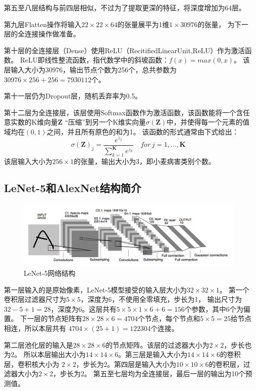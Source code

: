   第五至八层结构与前四层相似，不过为了提取更深的特征，将深度增加为64层。

  第九层Flatten操作将输入$22\times22\times64$的张量展平为1维$1\times30976$的张量，
  为下一层的全连接操作做准备。

  第十层的全连接层（Dense）使用ReLU（RecitifiedLinearUnit,ReLU）作为激活函数。
  ReLU即线性整流函数，指代数学中的斜坡函数：$f(x)=max(0,x)$。
  该层输入大小为$30976$，输出节点个数为256个，总共参数为$30976\times256+256=7930112$个。

  第十一层仍为Dropout层，随机丢弃率为0.5。

  第十二层为全连接层，该层使用Softmax函数作为激活函数，该函数能将一个含任意实数的K维向量$\mathbf{Z}$
  “压缩”到另一个K维实向量$\sigma(\mathbf{Z})$中，并使得每一个元素的值域均在$(0,1)$之间，并且所有原色的和为1。
  该函数的形式通常由下式给出：
  \[
    \sigma(\mathbf{Z})_j=\frac{e^{z_j}}{\sum^\mathbf{K}_{k=1} e^{z_k}} \quad for\ j=1, \dots,\mathbf{K}
  \]
  该层输入大小为$256\times1$的张量，输出大小为3，即小麦病害类别个数。




\subsection{\hei\xiaosan\textbf{LeNet-5和AlexNet结构简介}}
  \begin{figure}[htbp]
    \centering
    \includegraphics[width=\textwidth, natwidth=1612, natheight=482]{resource/2.4-网络结构.png}
    \caption{LeNet-5网络结构}
    \label{Figure.Third.2}
  \end{figure}
  第一层输入的是原始像素，LeNet-5模型接受的输入层大小为$32\times32\times1$。
  第一个卷积层过滤器尺寸为$5\times5$，深度为6，不使用全零填充，步长为1，
  输出尺寸为$32-5+1=28$，深度为6。这层共有$5\times5\times1\times6+6=156$个参数，其中6个为偏置。
  下一层的节点矩阵有$28\times28\times6=4704$个节点，每个节点和$5\times5=25$给节点相连，所以本层共有
  $4704\times(25+1)=122304$个连接。

  第二层池化层的输入是$28\times28\times6$的节点矩阵。该层的过滤器大小为$2\times2$，步长也为2。
  所以本层输出大小为$14\times14\times6$。第三层是输入大小为$14\times14\times6$的卷积层，卷积核大小为
  $2\times2$，步长为2。第四层是输入大小为$10\times10\times6$的卷积层，过滤器大小为$2\times2$，步长为2。
  第五至七层均为全连接层，最后一层的输出为10个预测值。


